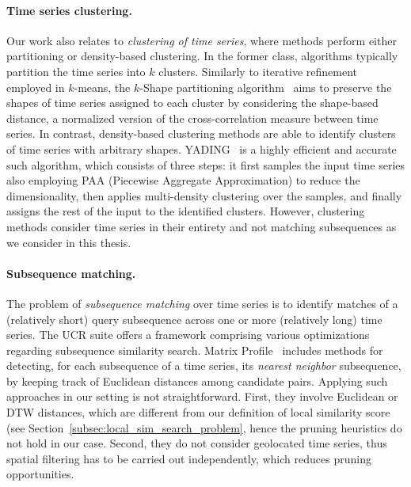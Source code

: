 \paragraph{Time series clustering.} Our work also relates to {\em clustering of time series}, where methods perform either partitioning or density-based clustering. In the former class, algorithms typically partition the time series into $k$ clusters. Similarly to iterative refinement employed in $k$-means, the $k$-Shape partitioning algorithm~\cite{Paparrizos:2015:KEA:2723372.2737793,Paparrizos:2017:FAT:3086510.3044711} aims to preserve the shapes of time series assigned to each cluster by considering the shape-based distance, a normalized version of the cross-correlation measure between time series. In contrast, density-based clustering methods are able to identify clusters of time series with arbitrary shapes. YADING~\cite{Ding:2015:YFC:2735479.2735481} is a highly efficient and accurate such algorithm, which consists of three steps: it first samples the input time series also employing PAA (Piecewise Aggregate Approximation) to reduce the dimensionality, then applies multi-density clustering over the samples, and finally assigns the rest of the input to the identified clusters. However, clustering methods consider time series in their entirety and not matching subsequences as we consider in this thesis.

\paragraph{Subsequence matching.} The problem of {\em subsequence matching} over time series is to identify matches of a (relatively short) query subsequence across one or more (relatively long) time series. The UCR suite \cite{rakthanmanon2012searching} offers a framework comprising various optimizations regarding subsequence similarity search. Matrix Profile~\cite{yeh2016matrix} includes methods for detecting, for each subsequence of a time series, its \textit{nearest neighbor} subsequence, by keeping track of Euclidean distances among candidate pairs. Applying such approaches in our setting is not straightforward. First, they involve Euclidean or DTW distances, which are different from our definition of local similarity score (see Section~\ref{subsec:local_sim_search_problem}, hence the pruning heuristics do not hold in our case. Second, they do not consider geolocated time series, thus spatial filtering has to be carried out independently, which reduces pruning opportunities.

